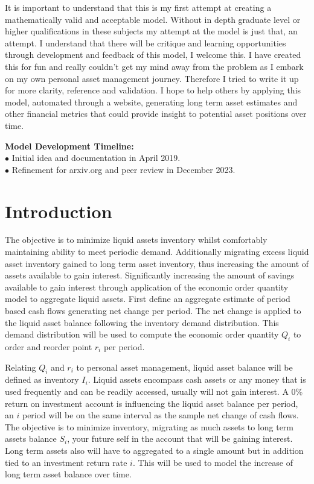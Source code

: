\documentclass{article}
\begin{document}
It is important to understand that this is my first attempt at creating a mathematically valid and acceptable model. Without in depth graduate level or higher qualifications in these subjects my attempt at the model is just that, an attempt. I understand that there will be critique and learning opportunities through development and feedback of this model, I welcome this. I have created this for fun and really couldn't get my mind away from the problem as I embark on my own personal asset management journey. Therefore I tried to write it up for more clarity, reference and validation. I hope to help others by applying this model, automated through a website, generating long term asset estimates and other financial metrics that could provide insight to potential asset positions over time.

\textbf{Model Development Timeline:}\\
$\bullet$ \; Initial idea and documentation in April 2019.\\
$\bullet$ \; Refinement for arxiv.org and peer review in December 2023. \\

\section{Introduction}

The objective is to minimize liquid assets inventory whilst comfortably maintaining ability to meet periodic demand. Additionally migrating excess liquid asset inventory gained to long term asset inventory, thus increasing the amount of assets available to gain interest. Significantly increasing  the amount of savings available to gain interest through application of the economic order quantity model to aggregate liquid assets. First define an aggregate estimate of period based cash flows generating net change per period. The net change is applied to the liquid asset balance following the inventory demand distribution. This demand distribution will be used to compute the economic order quantity $Q_{i}$ to order and reorder point $r_{i}$ per period. 

Relating $Q_{i}$ and $r_{i}$ to personal asset management, liquid asset balance will be defined as inventory $I_{i}$. Liquid assets encompass cash assets or any money that is used frequently and can be readily accessed, usually will not gain interest.  A 0\% return on investment account is influencing the liquid asset balance per period, an $i$ period will be on the same interval as the sample net change of cash flows. The objective is to minimize inventory, migrating as much assets to long term assets balance $S_{i}$, your future self in the account that will be gaining interest. Long term assets also will have to aggregated to a single amount but in addition tied to an investment return rate $i$. This will be used to model the increase of long term asset balance over time.\\
\end{document}
